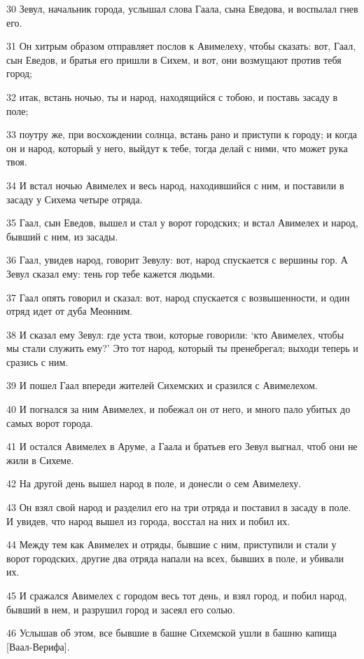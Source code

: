 \par 30 Зевул, начальник города, услышал слова Гаала, сына Еведова, и воспылал гнев его.
\par 31 Он хитрым образом отправляет послов к Авимелеху, чтобы сказать: вот, Гаал, сын Еведов, и братья его пришли в Сихем, и вот, они возмущают против тебя город;
\par 32 итак, встань ночью, ты и народ, находящийся с тобою, и поставь засаду в поле;
\par 33 поутру же, при восхождении солнца, встань рано и приступи к городу; и когда он и народ, который у него, выйдут к тебе, тогда делай с ними, что может рука твоя.
\par 34 И встал ночью Авимелех и весь народ, находившийся с ним, и поставили в засаду у Сихема четыре отряда.
\par 35 Гаал, сын Еведов, вышел и стал у ворот городских; и встал Авимелех и народ, бывший с ним, из засады.
\par 36 Гаал, увидев народ, говорит Зевулу: вот, народ спускается с вершины гор. А Зевул сказал ему: тень гор тебе кажется людьми.
\par 37 Гаал опять говорил и сказал: вот, народ спускается с возвышенности, и один отряд идет от дуба Меонним.
\par 38 И сказал ему Зевул: где уста твои, которые говорили: `кто Авимелех, чтобы мы стали служить ему?' Это тот народ, который ты пренебрегал; выходи теперь и сразись с ним.
\par 39 И пошел Гаал впереди жителей Сихемских и сразился с Авимелехом.
\par 40 И погнался за ним Авимелех, и побежал он от него, и много пало убитых до самых ворот города.
\par 41 И остался Авимелех в Аруме, а Гаала и братьев его Зевул выгнал, чтоб они не жили в Сихеме.
\par 42 На другой день вышел народ в поле, и донесли о сем Авимелеху.
\par 43 Он взял свой народ и разделил его на три отряда и поставил в засаду в поле. И увидев, что народ вышел из города, восстал на них и побил их.
\par 44 Между тем как Авимелех и отряды, бывшие с ним, приступили и стали у ворот городских, другие два отряда напали на всех, бывших в поле, и убивали их.
\par 45 И сражался Авимелех с городом весь тот день, и взял город, и побил народ, бывший в нем, и разрушил город и засеял его солью.
\par 46 Услышав об этом, все бывшие в башне Сихемской ушли в башню капища [Ваал-Верифа].
